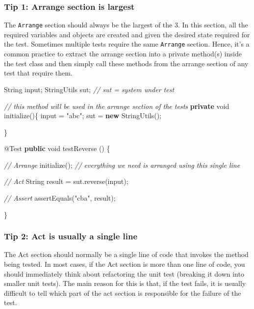 \documentclass[
]{book}
\newenvironment{Shaded}{\begin{snugshade}}{\end{snugshade}}
\newcommand{\AttributeTok}[1]{\textcolor[rgb]{0.77,0.63,0.00}{#1}}
\newcommand{\BuiltInTok}[1]{#1}
\newcommand{\CommentTok}[1]{\textcolor[rgb]{0.56,0.35,0.01}{\textit{#1}}}
\newcommand{\DataTypeTok}[1]{\textcolor[rgb]{0.13,0.29,0.53}{#1}}
\newcommand{\FunctionTok}[1]{\textcolor[rgb]{0.00,0.00,0.00}{#1}}
\newcommand{\KeywordTok}[1]{\textcolor[rgb]{0.13,0.29,0.53}{\textbf{#1}}}
\newcommand{\NormalTok}[1]{#1}
\newcommand{\StringTok}[1]{\textcolor[rgb]{0.31,0.60,0.02}{#1}}
\begin{document}
\hypertarget{tip-1-arrange-section-is-largest}{%
\subsubsection{Tip 1: Arrange section is largest}\label{tip-1-arrange-section-is-largest}}

The \texttt{Arrange} section should always be the largest of the 3. In this section, all the required variables and objects are created and given the desired state required for the test. Sometimes multiple tests require the same \texttt{Arrange} section. Hence, it's a common practice to extract the arrange section into a private method(s) inside the test class and then simply call these methods from the arrange section of any test that require them.

\begin{Shaded}
\begin{Highlighting}[]
\BuiltInTok{String}\NormalTok{ input;}
\NormalTok{StringUtils sut; }\CommentTok{// sut = system under test}

\CommentTok{// this method will be used in the arrange section of the tests}
\KeywordTok{private} \DataTypeTok{void} \FunctionTok{initialize}\NormalTok{()\{}
\NormalTok{    input = }\StringTok{"abc"}\NormalTok{;}
\NormalTok{    sut = }\KeywordTok{new} \FunctionTok{StringUtils}\NormalTok{();}

\NormalTok{\}}

\AttributeTok{@Test}
\KeywordTok{public} \DataTypeTok{void} \FunctionTok{testReverse}\NormalTok{ () \{}

    \CommentTok{// Arrange}
    \FunctionTok{initialize}\NormalTok{(); }\CommentTok{// everything we need is arranged using this single line}

    \CommentTok{// Act}
    \BuiltInTok{String}\NormalTok{ result = sut.}\FunctionTok{reverse}\NormalTok{(input);}

    \CommentTok{// Assert}
    \FunctionTok{assertEquals}\NormalTok{(}\StringTok{"cba"}\NormalTok{, result);}

\NormalTok{\}}
\end{Highlighting}
\end{Shaded}

\hypertarget{singleline}{%
\subsubsection{Tip 2: Act is usually a single line}\label{singleline}}

The Act section should normally be a single line of code that invokes the method being tested. In most cases, if the Act section is more than one line of code, you should immediately think about refactoring the unit test (breaking it down into smaller unit tests). The main reason for this is that, if the test fails, it is usually difficult to tell which part of the act section is responsible for the failure of the test.
\end{document}
